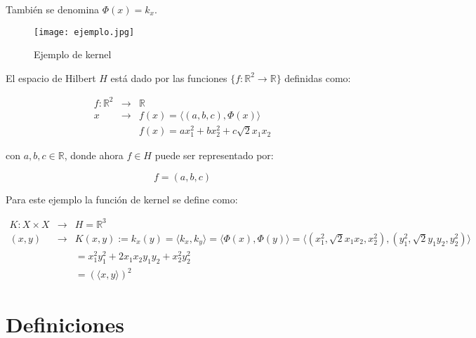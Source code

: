 \documentclass[12pt]{article}
\begin{document}
También se denomina $\Phi(x)=k_x$.


\begin{figure}[ht!]
\centering
\texttt{[image: ejemplo.jpg]}
\caption{Ejemplo de kernel}
\label{ejemplo}
\end{figure}

El espacio de Hilbert $H$ está dado por las funciones $\{f:\mathbb{R}^2 \rightarrow \mathbb{R}\}$ definidas como:

\begin{eqnarray*}
f: \mathbb{R}^2 &\rightarrow& \mathbb{R} \\
x &\rightarrow& f(x) = \langle (a,b,c), \Phi(x)\rangle \\
& & f(x) = a x_1^2 + b x_2 ^2 + c \sqrt{2} x_1 x_2
\end{eqnarray*}

\noindent con $a,b,c \in \mathbb{R}$, donde ahora $f \in H$ puede ser representado por:

\begin{equation}
f= (a,b,c)
\end{equation}

Para este ejemplo la función de kernel se define como:


\begin{eqnarray*}
K: X \times X &\rightarrow &H=\mathbb{R}^3 \\
    (x,y) &\rightarrow & K(x,y):=k_x(y) =\langle k_x, k_y \rangle =\langle \Phi(x), \Phi(y) \rangle = \langle (x_1^2,\sqrt{2}x_1 x_2,x_2^2),(y_1^2,\sqrt{2}y_1 y_2,y_2^2) \rangle \\
    & & =  x_1^2 y_1^2 + 2x_1x_2y_1 y_2 + x_2^2 y_2^2 \\
    & & = (\langle x,y \rangle)^2
\end{eqnarray*}










\newpage
\section{Definiciones}
\label{sec:def}
\end{document}
